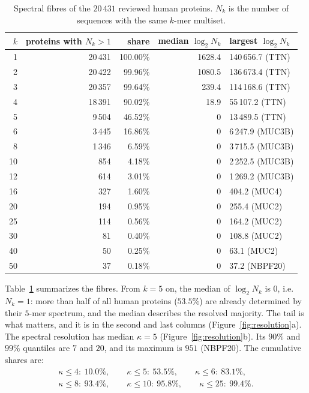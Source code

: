 \documentclass[11pt]{article}
\theoremstyle{plain}
\theoremstyle{definition}
\theoremstyle{remark}
\begin{document}
\begin{table}[t]
\centering\small
\begin{tabular}{rrrrl}
\toprule
$k$ & proteins with $N_k>1$ & share & median $\log_2N_k$ & largest $\log_2N_k$\\
\midrule
1 & 20\,431 & 100.00\% & 1628.4 & 140\,656.7 (TTN)\\
2 & 20\,422 & 99.96\% & 1080.5 & 136\,673.4 (TTN)\\
3 & 20\,357 & 99.64\% & 239.4 & 114\,168.6 (TTN)\\
4 & 18\,391 & 90.02\% & 18.9 & 55\,107.2 (TTN)\\
5 & 9\,504 & 46.52\% & 0 & 13\,489.5 (TTN)\\
6 & 3\,445 & 16.86\% & 0 & 6\,247.9 (MUC3B)\\
8 & 1\,346 & 6.59\% & 0 & 3\,715.5 (MUC3B)\\
10 & 854 & 4.18\% & 0 & 2\,252.5 (MUC3B)\\
12 & 614 & 3.01\% & 0 & 1\,269.2 (MUC3B)\\
16 & 327 & 1.60\% & 0 & 404.2 (MUC4)\\
20 & 194 & 0.95\% & 0 & 255.4 (MUC2)\\
25 & 114 & 0.56\% & 0 & 164.2 (MUC2)\\
30 & 81 & 0.40\% & 0 & 108.8 (MUC2)\\
40 & 50 & 0.25\% & 0 & 63.1 (MUC2)\\
50 & 37 & 0.18\% & 0 & 37.2 (NBPF20)\\
\bottomrule
\end{tabular}
\caption{Spectral fibres of the $20\,431$ reviewed human proteins. $N_k$ is the number of sequences
with the same $k$-mer multiset.}\label{tab:fibres}
\end{table}

Table~\ref{tab:fibres} summarizes the fibres. From $k=5$ on, the median of $\log_2N_k$ is $0$, i.e.\
$N_k=1$: more than half of all human proteins ($53.5\%$) are already determined by their $5$-mer
spectrum, and the median describes the resolved majority. The tail is what matters, and it is in the
second and last columns (Figure~\ref{fig:resolution}a). The spectral resolution has median $\kappa=5$
(Figure~\ref{fig:resolution}b). Its
$90\%$ and $99\%$ quantiles are $7$ and $20$, and its maximum is $951$ (NBPF20). The cumulative shares
are:
\begin{gather*}
\kappa\le4:\ 10.0\%,\qquad \kappa\le5:\ 53.5\%,\qquad \kappa\le6:\ 83.1\%,\\
\kappa\le8:\ 93.4\%,\qquad \kappa\le10:\ 95.8\%,\qquad \kappa\le25:\ 99.4\%.
\end{gather*}
\end{document}
